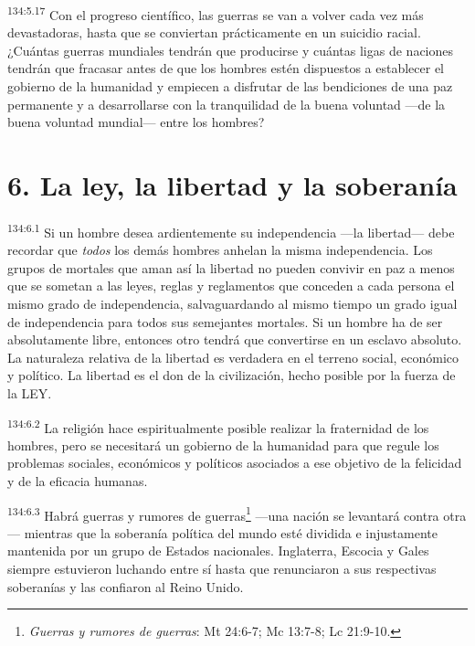\par
\textsuperscript{134:5.17} Con el progreso científico, las guerras se van a volver cada vez más devastadoras, hasta que se conviertan prácticamente en un suicidio racial. ¿Cuántas guerras mundiales tendrán que producirse y cuántas ligas de naciones tendrán que fracasar antes de que los hombres estén dispuestos a establecer el gobierno de la humanidad y empiecen a disfrutar de las bendiciones de una paz permanente y a desarrollarse con la tranquilidad de la buena voluntad ---de la buena voluntad mundial--- entre los hombres?

\section*{6. La ley, la libertad y la soberanía}
\par
\textsuperscript{134:6.1} Si un hombre desea ardientemente su independencia ---la libertad--- debe recordar que \textit{todos} los demás hombres anhelan la misma independencia. Los grupos de mortales que aman así la libertad no pueden convivir en paz a menos que se sometan a las leyes, reglas y reglamentos que conceden a cada persona el mismo grado de independencia, salvaguardando al mismo tiempo un grado igual de independencia para todos sus semejantes mortales. Si un hombre ha de ser absolutamente libre, entonces otro tendrá que convertirse en un esclavo absoluto. La naturaleza relativa de la libertad es verdadera en el terreno social, económico y político. La libertad es el don de la civilización, hecho posible por la fuerza de la LEY.

\par
\textsuperscript{134:6.2} La religión hace espiritualmente posible realizar la fraternidad de los hombres, pero se necesitará un gobierno de la humanidad para que regule los problemas sociales, económicos y políticos asociados a ese objetivo de la felicidad y de la eficacia humanas.

\par
\textsuperscript{134:6.3} Habrá guerras y rumores de guerras\footnote{\textit{Guerras y rumores de guerras}: Mt 24:6-7; Mc 13:7-8; Lc 21:9-10.} ---una nación se levantará contra otra--- mientras que la soberanía política del mundo esté dividida e injustamente mantenida por un grupo de Estados nacionales. Inglaterra, Escocia y Gales siempre estuvieron luchando entre sí hasta que renunciaron a sus respectivas soberanías y las confiaron al Reino Unido.

